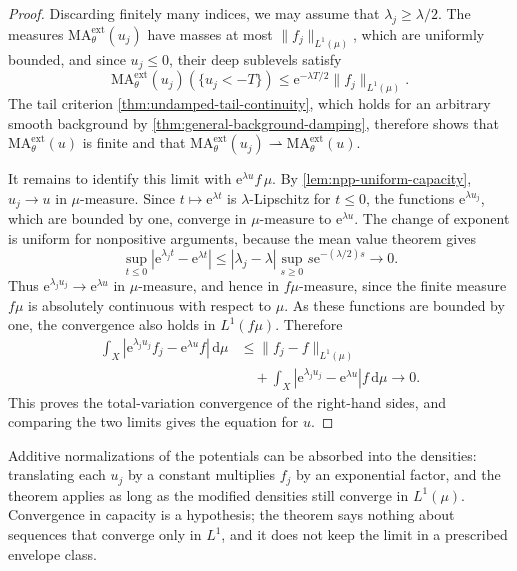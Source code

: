 \begin{proof}
Discarding finitely many indices, we may assume that $\lambda_j\geq\lambda/2$. The measures $\mathrm{MA}^{\mathrm{ext}}_\theta(u_j)$ have masses at most $\|f_j\|_{L^1(\mu)}$, which are uniformly bounded, and since $u_j\leq0$, their deep sublevels satisfy
\[
 \mathrm{MA}^{\mathrm{ext}}_\theta(u_j)(\{u_j<-T\})
 \leq \mathrm{e}^{-\lambda T/2}\|f_j\|_{L^1(\mu)}.
\]
The tail criterion \cref{thm:undamped-tail-continuity}, which holds for an arbitrary smooth background by \cref{thm:general-background-damping}, therefore shows that $\mathrm{MA}^{\mathrm{ext}}_\theta(u)$ is finite and that $\mathrm{MA}^{\mathrm{ext}}_\theta(u_j)\rightharpoonup\mathrm{MA}^{\mathrm{ext}}_\theta(u)$.

It remains to identify this limit with $\mathrm{e}^{\lambda u}f\,\mu$. By \cref{lem:npp-uniform-capacity}, $u_j\to u$ in $\mu$-measure. Since $t\mapsto\mathrm{e}^{\lambda t}$ is $\lambda$-Lipschitz for $t\leq0$, the functions $\mathrm{e}^{\lambda u_j}$, which are bounded by one, converge in $\mu$-measure to $\mathrm{e}^{\lambda u}$. The change of exponent is uniform for nonpositive arguments, because the mean value theorem gives
\[
 \sup_{t\leq0}|\mathrm{e}^{\lambda_jt}-\mathrm{e}^{\lambda t}|
 \leq |\lambda_j-\lambda|
       \sup_{s\geq0}s \mathrm{e}^{-(\lambda/2)s}\longrightarrow0.
\]
Thus $\mathrm{e}^{\lambda_j u_j}\to \mathrm{e}^{\lambda u}$ in $\mu$-measure, and hence in $f\mu$-measure, since the finite measure $f\mu$ is absolutely continuous with respect to $\mu$. As these functions are bounded by one, the convergence also holds in $L^1(f\mu)$. Therefore
\[
 \begin{split}
 \int_X|\mathrm{e}^{\lambda_j u_j}f_j-\mathrm{e}^{\lambda u}f|\,\mathrm{d}\mu
 &\leq\|f_j-f\|_{L^1(\mu)}\\
 &\quad+\int_X|\mathrm{e}^{\lambda_j u_j}-\mathrm{e}^{\lambda u}|f\,\mathrm{d}\mu
 \longrightarrow0.
 \end{split}
\]
This proves the total-variation convergence of the right-hand sides, and comparing the two limits gives the equation for $u$.
\end{proof}

Additive normalizations of the potentials can be absorbed into the densities: translating each $u_j$ by a constant multiplies $f_j$ by an exponential factor, and the theorem applies as long as the modified densities still converge in $L^1(\mu)$. Convergence in capacity is a hypothesis; the theorem says nothing about sequences that converge only in $L^1$, and it does not keep the limit in a prescribed envelope class.

